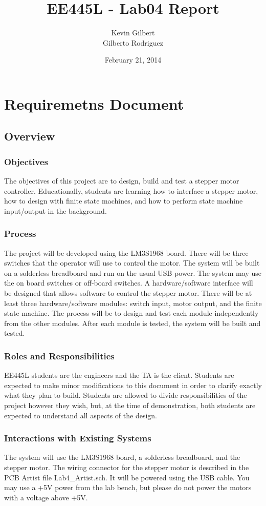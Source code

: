 \documentclass[twoside]{article}
\title{EE445L - Lab04 Report}
\author{Kevin Gilbert\\ Gilberto Rodriguez}
\date{February 21, 2014}
\begin{document}
\maketitle{}

\section*{Requiremetns Document}
\subsection*{Overview}
\subsubsection*{Objectives}
The objectives of this project are to design, build and test a stepper motor controller. Educationally, students are learning how to interface a stepper motor, how to design with finite state machines, and how to perform state machine input/output in the background.
\subsubsection*{Process}
The project will be developed using the LM3S1968 board. There will be three switches that the operator will use to control the motor. The system will be built on a solderless breadboard and run on the usual USB power. The system may use the on board switches or off-board switches. A hardware/software interface will be designed that allows software to control the stepper motor. There will be at least three hardware/software modules: switch input, motor output, and the finite state machine. The process will be to design and test each module independently from the other modules. After each module is tested, the system will be built and tested.
\subsubsection*{Roles and Responsibilities}
EE445L students are the engineers and the TA is the client. Students are expected to make minor modifications to this document in order to clarify exactly what they plan to build. Students are allowed to divide responsibilities of the project however they wish, but, at the time of demonstration, both students are expected to understand all aspects of the design.
\subsubsection*{Interactions with Existing Systems}
The system will use the LM3S1968 board, a solderless breadboard, and the stepper motor. The wiring connector for the stepper motor is described in the PCB Artist file Lab4\_Artist.sch. It will be powered using the USB cable. You may use a +5V power from the lab bench, but please do not power the motors with a voltage above +5V.
\end{document}
